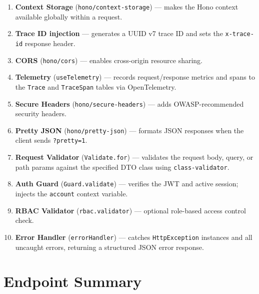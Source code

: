 \documentclass[12pt,a4paper]{article}
\begin{document}
\begin{enumerate}[label=\arabic*.]
  \item \textbf{Context Storage} (\texttt{hono/context-storage}) — makes the Hono context available globally within a request.
  \item \textbf{Trace ID injection} — generates a UUID v7 trace ID and sets the \texttt{x-trace-id} response header.
  \item \textbf{CORS} (\texttt{hono/cors}) — enables cross-origin resource sharing.
  \item \textbf{Telemetry} (\texttt{useTelemetry}) — records request/response metrics and spans to the \texttt{Trace} and \texttt{TraceSpan} tables via OpenTelemetry.
  \item \textbf{Secure Headers} (\texttt{hono/secure-headers}) — adds OWASP-recommended security headers.
  \item \textbf{Pretty JSON} (\texttt{hono/pretty-json}) — formats JSON responses when the client sends \texttt{?pretty=1}.
  \item \textbf{Request Validator} (\texttt{Validate.for}) — validates the request body, query, or path params against the specified DTO class using \texttt{class-validator}.
  \item \textbf{Auth Guard} (\texttt{Guard.validate}) — verifies the JWT and active session; injects the \texttt{account} context variable.
  \item \textbf{RBAC Validator} (\texttt{rbac.validator}) — optional role-based access control check.
  \item \textbf{Error Handler} (\texttt{errorHandler}) — catches \texttt{HttpException} instances and all uncaught errors, returning a structured JSON error response.
\end{enumerate}

\newpage

\section{Endpoint Summary}
\end{document}

